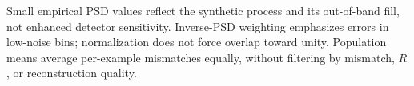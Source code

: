 \documentclass[10pt,prd,aps,a4paper,twocolumn,superscriptaddress,nofootinbib,floatfix]{revtex4-2}
\begin{document}
Small empirical PSD values reflect the synthetic process and its out-of-band fill, not enhanced detector sensitivity. Inverse-PSD weighting emphasizes errors in low-noise bins; normalization does not force overlap toward unity. Population means average per-example mismatches equally, without filtering by mismatch, $R$, or reconstruction quality.


\end{document}
